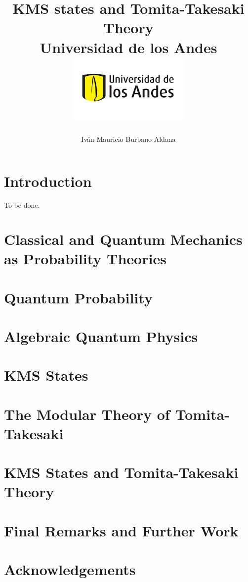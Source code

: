\documentclass[12pt]{report}
\title 
{
	{KMS states and Tomita-Takesaki Theory}\\
	{\large Universidad de los Andes}\\
	{\includegraphics{logo.png}}	
}
\author{Iván Mauricio Burbano Aldana}
\theoremstyle{definition}
\begin{document}

\maketitle

\tableofcontents

\chapter{Introduction}
To be done.


\chapter{Classical and Quantum Mechanics as Probability Theories}


\chapter{Quantum Probability}


\chapter{Algebraic Quantum Physics}


\chapter{KMS States}


\chapter{The Modular Theory of Tomita-Takesaki}


\chapter{KMS States and Tomita-Takesaki Theory}


\chapter{Final Remarks and Further Work}




\chapter{Acknowledgements}
\end{document}
